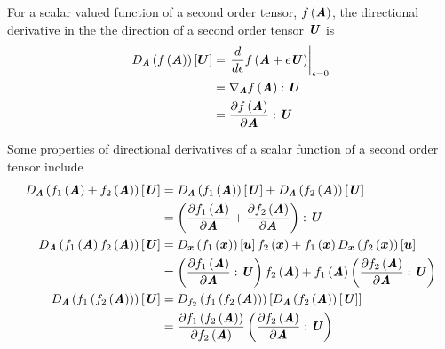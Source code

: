 For a scalar valued function of a second order tensor, $ f\left( \boldsymbol{\mathit{A}} \right) $,
the directional derivative in the the direction of a second order tensor
$\boldsymbol{\mathit{U}}$ is
\begin{equation}
  \begin{split}
    \directionalderiv{\tensor{A}}{\fnof{f}{\tensor{A}}}{\vectr{U}}&=\evalat{\dfrac{d}{d\epsilon}\fnof{f}{\tensor{A}+\epsilon\tensor{U}}}{\epsilon=0}\\
    &=\doubledotprod{\gradient{\tensor{A}}{\fnof{f}{\tensor{A}}}}{\tensor{U}}\\
    &=\doubledotprod{\delby{\fnof{f}{\tensor{A}}}{\tensor{A}}}{\tensor{U}}\\
  \end{split}  
\end{equation}

Some properties of directional derivatives of a scalar function of a second
order tensor include
\begin{equation}
  \begin{split}
    \directionalderiv{\tensor{A}}{\fnof{f_{1}}{\tensor{A}}+\fnof{f_{2}}{\tensor{A}}}{\tensor{U}}&=\directionalderiv{\tensor{A}}{\fnof{f_{1}}{\tensor{A}}}{\tensor{U}}+\directionalderiv{\tensor{A}}{\fnof{f_{2}}{\tensor{A}}}{\tensor{U}}\\
    &=\doubledotprod{\pbrac{\delby{\fnof{f_{1}}{\tensor{A}}}{\tensor{A}}+\delby{\fnof{f_{2}}{\tensor{A}}}{\tensor{A}}}}{\tensor{U}}\\
    \directionalderiv{\tensor{A}}{\fnof{f_{1}}{\tensor{A}}\fnof{f_{2}}{\tensor{A}}}{\tensor{U}}&=\directionalderiv{\vectr{x}}{\fnof{f_{1}}{\vectr{x}}}{\vectr{u}}\fnof{f_{2}}{\vectr{x}}+\fnof{f_{1}}{\vectr{x}}\directionalderiv{\vectr{x}}{\fnof{f_{2}}{\vectr{x}}}{\vectr{u}}\\
    &=\pbrac{\doubledotprod{\delby{\fnof{f_{1}}{\tensor{A}}}{\tensor{A}}}{\tensor{U}}}\fnof{f_{2}}{\tensor{A}}+\fnof{f_{1}}{\tensor{A}}\pbrac{\doubledotprod{\delby{\fnof{f_{2}}{\tensor{A}}}{\tensor{A}}}{\tensor{U}}} \\
    \directionalderiv{\tensor{A}}{\fnof{f_{1}}{\fnof{f_{2}}{\tensor{A}}}}{\tensor{U}}&=\directionalderiv{f_{2}}{\fnof{f_{1}}{\fnof{f_{2}}{\tensor{A}}}}{\directionalderiv{\tensor{A}}{\fnof{f_{2}}{\tensor{A}}}{\tensor{U}}}\\
    &=\delby{\fnof{f_{1}}{\fnof{f_{2}}{\tensor{A}}}}{\fnof{f_{2}}{\tensor{A}}}\pbrac{\doubledotprod{\delby{\fnof{f_{2}}{\tensor{A}}}{\tensor{A}}}{\tensor{U}}}
  \end{split}
\end{equation}

